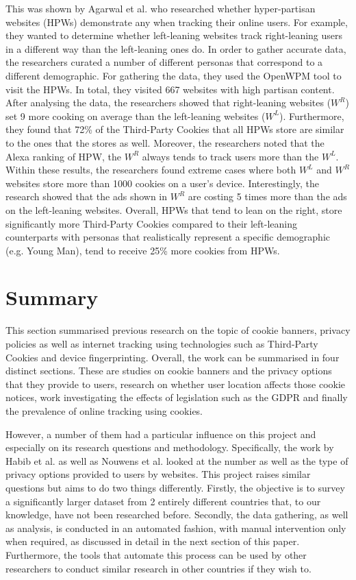 \documentclass[../main.tex]{subfiles}
\begin{document}
This was shown by Agarwal et al. \cite{agarwal2020stop} who researched whether hyper-partisan websites (HPWs) demonstrate any  when tracking their online users. For example, they wanted to determine whether left-leaning websites track right-leaning users in a different way than the left-leaning ones do. In order to gather accurate data, the researchers curated a number of different personas that correspond to a different demographic. For gathering the data, they used the OpenWPM tool to visit the HPWs. In total, they visited 667 websites with high partisan content. After analysing the data, the researchers showed that right-leaning websites ($W^R$) set 9 more cooking on average than the left-leaning websites ($W^L$). Furthermore, they found that 72\% of the Third-Party Cookies that all HPWs store are similar to the ones that the  stores as well. Moreover, the researchers noted that the Alexa ranking of HPW, the $W^R$ always tends to track users more than the $W^L$. Within these results, the researchers found extreme cases where both $W^L$ and $W^R$ websites store more than 1000 cookies on a user’s device. Interestingly, the research showed that the ads shown in $W^R$ are costing 5 times more than the ads on the left-leaning websites. Overall, HPWs that tend to lean on the right, store significantly more Third-Party Cookies compared to their left-leaning counterparts with personas that realistically represent a specific demographic (e.g. Young Man), tend to receive 25\% more cookies from HPWs.

\section{Summary}
This section summarised previous research on the topic of cookie banners, privacy policies as well as internet tracking using technologies such as Third-Party Cookies and device fingerprinting. Overall, the work can be summarised in four distinct sections. These are studies on cookie banners and the privacy options that they provide to users, research on whether user location affects those cookie notices, work investigating the effects of legislation such as the GDPR and finally the prevalence of online tracking using cookies. 

However, a number of them had a particular influence on this project and especially on its research questions and methodology. Specifically, the work by Habib et al. as well as Nouwens et al. looked at the number as well as the type of privacy options provided to users by websites. This project raises similar questions but aims to do two things differently. Firstly, the objective is to survey a significantly larger dataset from 2 entirely different countries that, to our knowledge, have not been researched before. Secondly, the data gathering, as well as analysis, is conducted in an automated fashion, with manual intervention only when required, as discussed in detail in the next section of this paper. Furthermore, the tools that automate this process can be used by other researchers to conduct similar research in other countries if they wish to.
\end{document}
